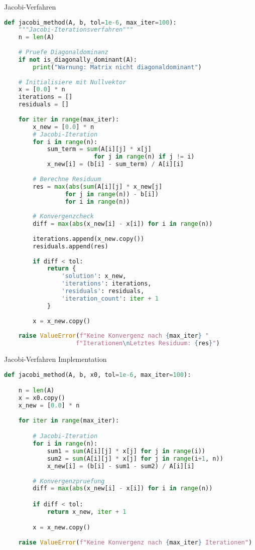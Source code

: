 \begin{examplecode}{Jacobi-Verfahren}
\begin{lstlisting}[language=Python, style=basesmol]
def jacobi_method(A, b, tol=1e-6, max_iter=100):
    """Jacobi-Iterationsverfahren"""
    n = len(A)
    
    # Pruefe Diagonaldominanz
    if not is_diagonally_dominant(A):
        print("Warnung: Matrix nicht diagonaldominant")
    
    # Initialisiere mit Nullvektor
    x = [0.0] * n
    iterations = []
    residuals = []
    
    for iter in range(max_iter):
        x_new = [0.0] * n
        # Jacobi-Iteration
        for i in range(n):
            sum_term = sum(A[i][j] * x[j] 
                         for j in range(n) if j != i)
            x_new[i] = (b[i] - sum_term) / A[i][i]
            
        # Berechne Residuum
        res = max(abs(sum(A[i][j] * x_new[j] 
                 for j in range(n)) - b[i]) 
                 for i in range(n))
                 
        # Konvergenzcheck
        diff = max(abs(x_new[i] - x[i]) for i in range(n))
        
        iterations.append(x_new.copy())
        residuals.append(res)
        
        if diff < tol:
            return {
                'solution': x_new,
                'iterations': iterations,
                'residuals': residuals,
                'iteration_count': iter + 1
            }
            
        x = x_new.copy()
        
    raise ValueError(f"Keine Konvergenz nach {max_iter} "
                    f"Iterationen\nLetztes Residuum: {res}")
\end{lstlisting}
\end{examplecode}

\begin{examplecode}{Jacobi-Verfahren Implementation}
\begin{lstlisting}[language=Python, style=basesmol]
def jacobi_method(A, b, x0, tol=1e-6, max_iter=100):

    n = len(A)
    x = x0.copy()
    x_new = [0.0] * n
    
    for iter in range(max_iter):

        # Jacobi-Iteration
        for i in range(n):
            sum1 = sum(A[i][j] * x[j] for j in range(i))
            sum2 = sum(A[i][j] * x[j] for j in range(i+1, n))
            x_new[i] = (b[i] - sum1 - sum2) / A[i][i]
            
        # Konvergenzpruefung
        diff = max(abs(x_new[i] - x[i]) for i in range(n))

        if diff < tol:
            return x_new, iter + 1

        x = x_new.copy()
        
    raise ValueError(f"Keine Konvergenz nach {max_iter} Iterationen")
\end{lstlisting}
\end{examplecode}

